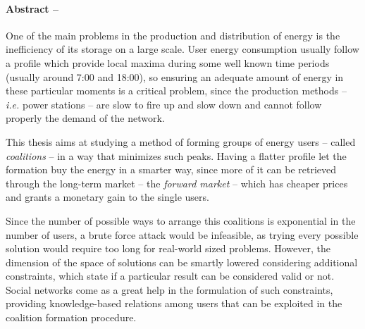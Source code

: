 \documentclass[11pt, twoside, titlepage, a4paper, openright]{report}
\begin{document}
\begin{frontespizio}
\Rientro {1.5cm}
\end{frontespizio}

\tableofcontents


\listoffigures

\listofalgorithms

\newpage

\paragraph{Abstract --}
One of the main problems in the production and distribution of energy is the inefficiency of its storage on a large scale. User energy consumption usually follow a profile which provide local maxima during some well known time periods (usually around 7:00 and 18:00), so ensuring an adequate amount of energy in these particular moments is a critical problem, since the production methods -- \textit{i.e.} power stations -- are slow to fire up and slow down and cannot follow properly the demand of the network.

This thesis aims at studying a method of forming groups of energy users -- called \textit{coalitions} -- in a way that minimizes such peaks. Having a flatter profile let the formation buy the energy in a smarter way, since more of it can be retrieved through the long-term market -- the \textit{forward market} -- which has cheaper prices and grants a monetary gain to the single users.

Since the number of possible ways to arrange this coalitions is exponential in the number of users, a brute force attack would be infeasible, as trying every possible solution would require too long for real-world sized problems. However, the dimension of the space of solutions can be smartly lowered considering additional constraints, which state if a particular result can be considered valid or not.
Social networks come as a great help in the formulation of such constraints, providing knowledge-based relations among users that can be exploited in the coalition formation procedure. 
\end{document}
